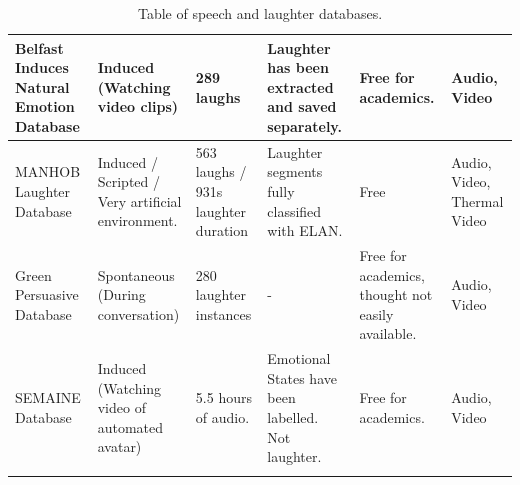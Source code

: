 \documentclass[a4paper,11pt,notitlepage]{article}
\begin{document}
\begin{landscape}
\begin{longtable}{|p{3cm}|p{4cm}|p{2cm}|p{3cm}|p{3.5cm}|p{3cm}|}
Belfast Induces Natural Emotion Database & Induced (Watching video clips) & 289 laughs & Laughter has been extracted and saved separately. & Free for academics. & Audio, Video \\ \hline

MANHOB Laughter Database & Induced / Scripted / Very artificial environment. & 563 laughs / 931s laughter duration & Laughter segments fully classified with ELAN. & Free & Audio, Video, Thermal Video \\ \hline

Green Persuasive Database & Spontaneous (During conversation) & 280 laughter instances & - & Free for academics, thought not easily available. & Audio, Video \\ \hline

SEMAINE Database & Induced (Watching video of automated avatar) & 5.5 hours of audio. & Emotional States have been labelled. Not laughter. & Free for academics. & Audio, Video \\ \hline

\caption{Table of speech and laughter databases.}
\label{table:table_of_databases}
\end{longtable}
\end{landscape}
\end{document}
